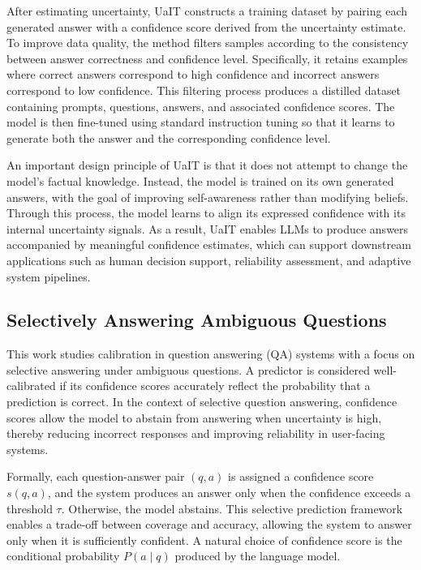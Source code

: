 After estimating uncertainty, UaIT constructs a training dataset by pairing each generated answer with a confidence score derived from the uncertainty estimate. To improve data quality, the method filters samples according to the consistency between answer correctness and confidence level. Specifically, it retains examples where correct answers correspond to high confidence and incorrect answers correspond to low confidence. This filtering process produces a distilled dataset containing prompts, questions, answers, and associated confidence scores. The model is then fine-tuned using standard instruction tuning so that it learns to generate both the answer and the corresponding confidence level.

An important design principle of UaIT is that it does not attempt to change the model’s factual knowledge. Instead, the model is trained on its own generated answers, with the goal of improving self-awareness rather than modifying beliefs. Through this process, the model learns to align its expressed confidence with its internal uncertainty signals. As a result, UaIT enables LLMs to produce answers accompanied by meaningful confidence estimates, which can support downstream applications such as human decision support, reliability assessment, and adaptive system pipelines.


\subsection{Selectively Answering Ambiguous Questions}

This work studies calibration in question answering (QA) systems with a focus on selective answering under ambiguous questions. A predictor is considered well-calibrated if its confidence scores accurately reflect the probability that a prediction is correct. In the context of selective question answering, confidence scores allow the model to abstain from answering when uncertainty is high, thereby reducing incorrect responses and improving reliability in user-facing systems.

Formally, each question-answer pair $(q, a)$ is assigned a confidence score $s(q, a)$, and the system produces an answer only when the confidence exceeds a threshold $\tau$. Otherwise, the model abstains. This selective prediction framework enables a trade-off between coverage and accuracy, allowing the system to answer only when it is sufficiently confident. A natural choice of confidence score is the conditional probability $P(a \mid q)$ produced by the language model.

